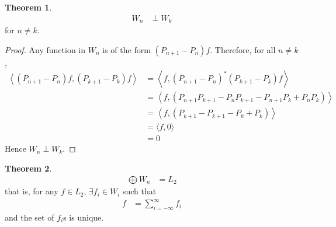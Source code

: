 \documentclass[titlepage, fleqn, a4paper, 12pt, twoside]{article}
\theoremstyle{definition}
\theoremstyle{theorem}
\newtheorem{theorem}{Theorem}
\begin{document}
\begin{theorem}
	\begin{align*}
		W_n &\perp W_k
	\end{align*}
	for $n \neq k$.
\end{theorem}

\begin{proof}
	Any function in $W_n$ is of the form $(P_{n + 1} - P_n) f$.
	Therefore, for all $n \neq k$,
	\begin{align*}
		\left\langle (P_{n + 1} - P_n) f , (P_{k + 1} - P_k) f \right\rangle &= \left\langle f , (P_{n + 1} - P_n)^* (P_{k + 1} - P_k) f \right\rangle\\
		&= \left\langle f , (P_{n + 1} P_{k + 1} - P_n P_{k + 1} - P_{n + 1} P_k + P_n P_k) \right\rangle\\
		&= \left\langle f , (P_{k + 1} - P_{k + 1} - P_k + P_k) \right\rangle\\
		&= \langle f , 0 \rangle\\
		&= 0
	\end{align*}
	Hence $W_n \perp W_k$.
\end{proof}
%
\begin{theorem}
	\begin{align*}
		\bigoplus W_n &= L_2
	\end{align*}
	that is, for any $f \in L_2$, $\exists f_i \in W_i$ such that
	\begin{align*}
		f &= \sum\limits_{i = -\infty}^{\infty} f_i
	\end{align*}
	and the set of $f_i$s is unique.
\end{theorem}
\end{document}
